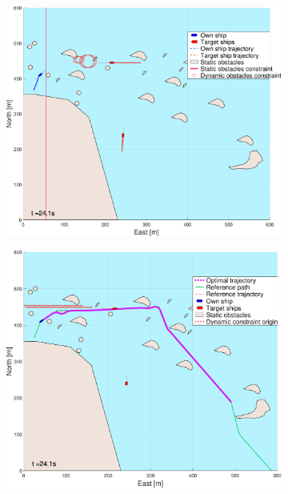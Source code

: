 \begin{figure}[!ht] %
    \begin{subfigure}[b]{0.494\textwidth}
        \centering
        \includegraphics[width=\textwidth]{Images/NewFigures/skjergard_m_trafikk_NEW/_Simple_1fig1_time=25}
        \subcaption{}
    \end{subfigure}
    \hfill
    \begin{subfigure}[b]{0.494\textwidth}
        \centering
        \includegraphics[width=\textwidth]{Images/NewFigures/skjergard_m_trafikk_NEW/_Simple_1fig999_time=25}

\end{subfigure}
\end{figure}
